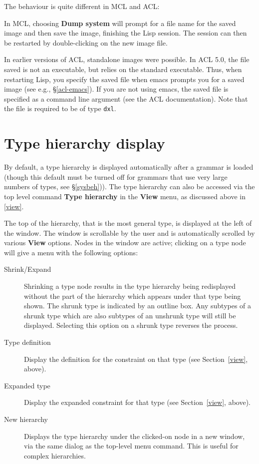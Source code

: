 \documentclass[12pt]{report}
\begin{document}
The behaviour is quite different in MCL and ACL:

In MCL, choosing {\bf Dump system} will prompt for a file name for the saved
image and then save the image, finishing the Lisp session.  
The session can then be restarted by double-clicking on the new image file.

In earlier versions of ACL, standalone images were possible.  In ACL 5.0, the
file saved is not an executable, but relies on the standard executable.  Thus,
when restarting Lisp, you specify the saved file when emacs prompts you for a
saved image (see e.g., \S\ref{acl-emacs}).  If you are not using emacs, the
saved file is specified as a command line argument (see the ACL documentation).
Note that the file is required to be of type {\tt dxl}.


\section{Type hierarchy display}
\label{thier}

By default, a type hierarchy
is displayed automatically after a grammar is loaded 
(though this default must be turned off for grammars that use very
large numbers of types, see \S\ref{sysbeh})).
The type hierarchy
can also be accessed via the top level command {\bf Type hierarchy}
in the {\bf View} menu, as discussed above in \ref{view}.

The top of the hierarchy, that is the most
general type, is displayed at the left of the window.  The window is
scrollable by the user and is automatically scrolled by various {\bf
View} options.  Nodes in the window are active; clicking on a type
node will give a menu with the following options:
\begin{description}
\item[Shrink/Expand] Shrinking a type node results in the type
hierarchy being redisplayed without the part of the hierarchy which
appears under that type being shown.  The shrunk type is indicated by
an outline box.  Any subtypes of a shrunk type which are also subtypes
of an unshrunk type will still be displayed.  Selecting this option on
a shrunk type reverses the process.
\item[Type definition] 
Display the definition for the constraint on that 
type (see Section~\ref{view},
above).
\item[Expanded type]
Display the expanded constraint for that type (see
Section~\ref{view}, above).
\item[New hierarchy]
Displays the type hierarchy under the clicked-on node in a new
window, via the same dialog as the top-level menu command.
This is useful for complex hierarchies.
\end{description}
\end{document}
